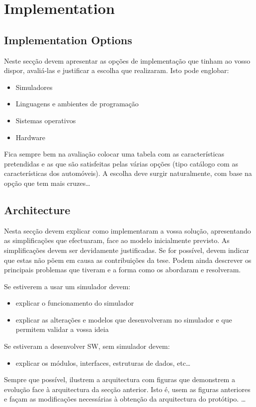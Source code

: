 \chapter{Implementation}
\label{chapter:implementation}

\section{Implementation Options}
Neste secção devem apresentar as opções de implementação que tinham ao vosso
dispor, avaliá-las e justificar a escolha que realizaram. Isto pode englobar:
\begin{itemize}
    \item Simuladores
    \item Linguagens e ambientes de programação
    \item Sistemas operativos
    \item Hardware
\end{itemize}
Fica sempre bem na avaliação colocar uma tabela com as características
pretendidas e as que são satisfeitas pelas várias opções (tipo catálogo com as
características dos automóveis). A escolha deve surgir naturalmente, com base na
opção que tem mais cruzes\ldots

\section{Architecture}
Nesta secção devem explicar como implementaram a vossa solução, apresentando
as simplificações que efectuaram, face ao modelo inicialmente previsto. As
simplificações devem ser devidamente justificadas. Se for possível, devem indicar
que estas não põem em causa as contribuições da tese.
Podem ainda descrever os principais problemas que tiveram e a forma como os
abordaram e resolveram.

Se estiverem a usar um simulador devem:

\begin{itemize}
    \item explicar o funcionamento do simulador
    \item explicar as alterações e modelos que desenvolveram no simulador e que permitem validar a vossa ideia
\end{itemize}

Se estiveram a desenvolver SW, sem simulador devem:
\begin{itemize}
    \item explicar os módulos, interfaces, estruturas de dados, etc\ldots
\end{itemize}

Sempre que possível, ilustrem a arquitectura com figuras que demonstrem a
evolução face à arquitectura da secção anterior. Isto é, usem as figuras anteriores
e façam as modificações necessárias à obtenção da arquitectura do protótipo.
\ldots
